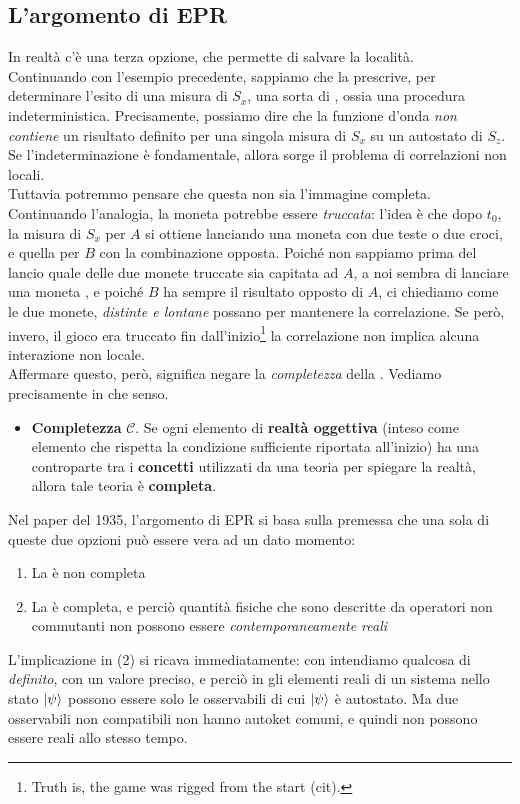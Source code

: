 \documentclass[../../FisicaTeorica.tex]{subfiles}
\begin{document}
\subsection{L'argomento di EPR}
In realtà c'è una terza opzione, che permette di salvare la località.\\
Continuando con l'esempio precedente, sappiamo che la \MQ prescrive, per determinare l'esito di una misura di $S_x$, una sorta di , ossia una procedura indeterministica. Precisamente, possiamo dire che la funzione d'onda \textit{non contiene} un risultato definito per una singola misura di $S_x$ su un autostato di $S_z$. Se l'indeterminazione è fondamentale, allora sorge il problema di correlazioni non locali.\\
Tuttavia potremmo pensare che questa non sia l'immagine completa. Continuando l'analogia, la moneta potrebbe essere \textit{truccata}: l'idea è che dopo $t_0$, la misura di $S_x$ per $A$ si ottiene lanciando una moneta con due teste o due croci, e quella per $B$ con la combinazione opposta. Poiché non sappiamo prima del lancio quale delle due monete truccate sia capitata ad $A$, a noi sembra di lanciare una moneta , e poiché $B$ ha sempre il risultato opposto di $A$, ci chiediamo come le due monete, \textit{distinte e lontane} possano  per mantenere la correlazione. Se però, invero, il gioco era truccato fin dall'inizio\footnote{Truth is, the game was rigged from the start (cit).} la correlazione non implica alcuna interazione non locale.\\
Affermare questo, però, significa negare la \textit{completezza} della \MQ. Vediamo precisamente in che senso.\\


\begin{itemize}
\item \textbf{Completezza} $\mathcal{C}$. Se ogni elemento di \textbf{realtà oggettiva} (inteso come elemento che rispetta la condizione sufficiente riportata all'inizio) ha una controparte tra i \textbf{concetti} utilizzati da una teoria per spiegare la realtà, allora tale teoria è \textbf{completa}.
\end{itemize}

Nel paper del 1935, l'argomento di EPR si basa sulla premessa che una sola di queste due opzioni può essere vera ad un dato momento:
\begin{enumerate}
\item La \MQ è non completa
\item La \MQ è completa, e perciò quantità fisiche che sono descritte da operatori non commutanti non possono essere \textit{contemporaneamente reali}
\end{enumerate}
L'implicazione in (2) si ricava immediatamente: con  intendiamo qualcosa di \textit{definito}, con un valore preciso, e perciò in \MQ gli elementi reali di un sistema nello stato $\Ket{\psi}$ possono essere solo le osservabili di cui $\Ket{\psi}$ è autostato. Ma due osservabili non compatibili non hanno autoket comuni, e quindi non possono essere reali allo stesso tempo.\\
\end{document}
